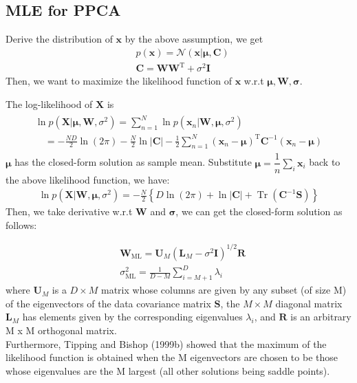 \documentclass{article}
\begin{document}
\subsection{MLE for PPCA}
Derive the distribution of $\mathbf{x}$ by the above assumption, we get
\begin{align*}
&p(\mathbf{x})=\mathcal{N}(\mathbf{x} | \boldsymbol{\mu}, \mathbf{C})\\
&\mathbf{C}=\mathbf{W} \mathbf{W}^{\mathrm{T}}+\sigma^{2} \mathbf{I}
\end{align*}
Then, we want to maximize the likelihood function of $\mathbf{x}$ w.r.t $\mathbf{\mu}, \mathbf{\mathbf{W}}, \mathbf{\sigma}$.

The log-likelihood of $\mathbf{X}$ is
\begin{align*}
\begin{array}{l}{\ln p\left(\mathbf{X} | \boldsymbol{\mu}, \mathbf{W}, \sigma^{2}\right)=\sum_{n=1}^{N} \ln p\left(\mathbf{x}_{n} | \mathbf{W}, \boldsymbol{\mu}, \sigma^{2}\right)} \\ {\quad=-\frac{N D}{2} \ln (2 \pi)-\frac{N}{2} \ln |\mathbf{C}|-\frac{1}{2} \sum_{n=1}^{N}\left(\mathbf{x}_{n}-\boldsymbol{\mu}\right)^{\mathrm{T}} \mathbf{C}^{-1}\left(\mathbf{x}_{n}-\boldsymbol{\mu}\right)}\end{array}
\end{align*}
$\mathbf{\mu}$ has the closed-form solution as sample mean. Substitute $\mathbf{\mu} = \dfrac{1}{n}\sum_{i}\mathbf{x}_i$ back to the above likelihood function, we have:
\begin{align*}
\ln p\left(\mathbf{X} | \mathbf{W}, \boldsymbol{\mu}, \sigma^{2}\right)=-\frac{N}{2}\left\{D \ln (2 \pi)+\ln |\mathbf{C}|+\operatorname{Tr}\left(\mathbf{C}^{-1} \mathbf{S}\right)\right\}
\end{align*}
Then, we take derivative w.r.t $\mathbf{W}$ and $\mathbf{\sigma}$, we can get the closed-form solution as follows:

\begin{align*}
&\mathbf{W}_{\mathrm{ML}}=\mathbf{U}_{M}\left(\mathbf{L}_{M}-\sigma^{2} \mathbf{I}\right)^{1 / 2} \mathbf{R}\\
&\sigma_{\mathrm{ML}}^{2}=\frac{1}{D-M} \sum_{i=M+1}^{D} \lambda_{i}
\end{align*}
where $\mathbf{U}_{M}$ is a $D \times M$ matrix whose columns are given by any subset (of size M) of the eigenvectors of the data covariance matrix $\mathbf{S}$, the $M \times M$ diagonal matrix $\mathbf{L}_{M}$ has elements given by the corresponding eigenvalues $\lambda_i$, and $\mathbf{R}$ is an arbitrary M x M orthogonal matrix. \\
Furthermore, Tipping and Bishop (1999b) showed that the maximum of the likelihood function is obtained when the M eigenvectors are chosen to be those whose eigenvalues are the M largest (all other solutions being saddle points).
\end{document}

